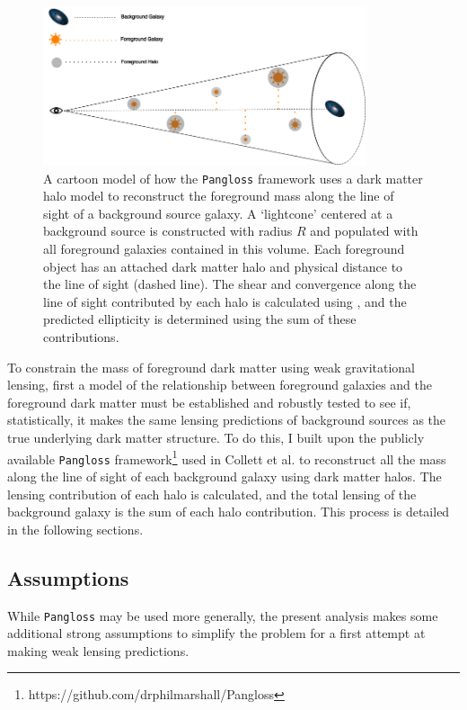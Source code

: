 \documentclass[%
 reprint,
 amsmath,amssymb,
 aps,nofootinbib
]{revtex4-1}
\begin{document}
\begin{figure}
    \centering
    \includegraphics[width=0.85\textwidth]{figs-swe/pangloss_cartoon.png}
    \captionsetup{justification=raggedright,singlelinecheck=false}
    \caption{A cartoon model of how the \texttt{Pangloss} framework uses a dark matter halo model to reconstruct the foreground mass along the line of sight of a background source galaxy. A `lightcone' centered at a background source is constructed with radius $R$ and populated with all foreground galaxies contained in this volume. Each foreground object has an attached dark matter halo and physical distance to the line of sight (dashed line). The shear and convergence along the line of sight contributed by each halo is calculated using \cite{lensing_calc}, and the predicted ellipticity is determined using the sum of these contributions.}
    \label{pangloss_cartoon}
\end{figure}

To constrain the mass of foreground dark matter using weak gravitational lensing, first a model of the relationship between foreground galaxies and the foreground dark matter must be established and robustly tested to see if, statistically, it makes the same lensing predictions of background sources as the true underlying dark matter structure. To do this, I built upon the publicly available \texttt{Pangloss} framework\footnote{\label{note1}https://github.com/drphilmarshall/Pangloss} used in Collett et al. \cite{collett_marshall} to reconstruct all the mass along the line of sight of each background galaxy using dark matter halos. The lensing contribution of each halo is calculated, and the total lensing of the background galaxy is the sum of each halo contribution. This process is detailed in the following sections.

\subsection*{Assumptions}
While \texttt{Pangloss} may be used more generally, the present analysis makes some additional strong assumptions to simplify the problem for a first attempt at making weak lensing predictions.
\end{document}
